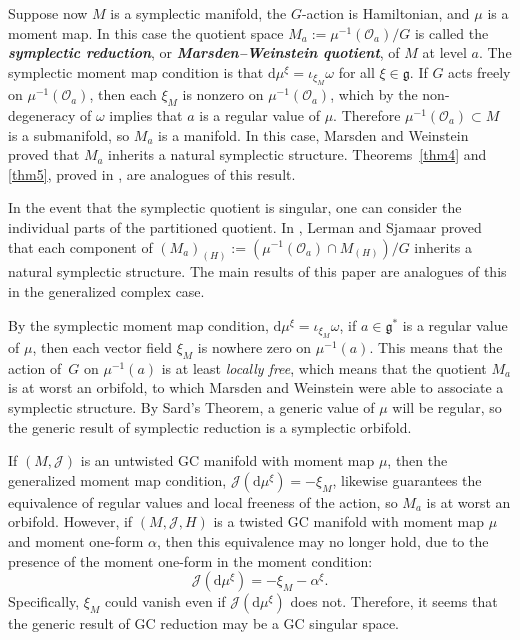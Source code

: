 \documentclass[pdftex]{sigma}
\numberwithin{equation}{section}
\newcommand{\deff}[1]{\textbf{\emph{#1}}}
\begin{document}
Suppose now $M$ is a symplectic manifold, the $G$-action is Hamiltonian, and $\mu$ is a moment map.  In this case the quotient space $M_a := \mu^{-1}(\mathcal{O}_a) / G$ is called the \deff{symplectic reduction}, or \deff{Marsden--Weinstein quotient}, of $M$ at level $a$.
The symplectic moment map condition is that $\mathrm{d} \mu^{\xi} = \iota_{\xi_M} \omega$ for all $\xi \in \mathfrak{g}$.  If $G$ acts freely on $\mu^{-1}(\mathcal{O}_a)$, then each $\xi_M$ is nonzero on $\mu^{-1}(\mathcal{O}_a)$, which by the non-degeneracy of $\omega$ implies that $a$ is a regular value of $\mu$.  Therefore $\mu^{-1}(\mathcal{O}_a) \subset M$ is a submanifold, so $M_a$ is a manifold.  In this case, Marsden and Weinstein proved that $M_a$ inherits a natural symplectic structure.  Theorems~\ref{thm4} and \ref{thm5}, proved in \cite{lintolman}, are analogues of this result.

In the event that the symplectic quotient is singular, one can consider the individual parts of the partitioned quotient.
In \cite{stratified}, Lerman and Sjamaar proved that each component of $\left( M_{a} \right)_{(H)} := \left( \mu^{-1}(\mathcal{O}_a) \cap M_{(H)} \right) / G$ inherits a natural symplectic structure.
The main results of this paper are analogues of this in the generalized complex case.


\begin{Remark} \label{rem3}
By the symplectic moment map condition, $\mathrm{d} \mu^{\xi} = \iota_{\xi_M} \omega$, if $a \in \mathfrak{g}^*$ is a regular value of $\mu$, then each vector f\/ield $\xi_M$ is nowhere zero on $\mu^{-1}(a)$.  This means that the action of~$G$ on $\mu^{-1}(a)$ is at least \emph{locally free}, which means that the quotient $M_a$ is at worst an orbifold, to which Marsden and Weinstein were able to associate a symplectic structure.  By Sard's Theorem, a generic value of $\mu$ will be regular, so the generic result of symplectic reduction is a symplectic orbifold.

If $(M,\mathcal{J})$ is an untwisted GC manifold with moment map $\mu$, then the generalized moment map condition, $\mathcal{J}(\mathrm{d} \mu^{\xi}) = -\xi_M$, likewise guarantees the equivalence of regular values and local freeness of the action, so $M_a$ is at worst an orbifold.  However, if $(M,\mathcal{J},H)$ is a twisted GC manifold with moment map $\mu$ and moment one-form $\alpha$, then this equivalence may no longer hold, due to the presence of the moment one-form in the moment condition:
\[
  \mathcal{J}(\mathrm{d} \mu^{\xi}) = -\xi_M - \alpha^{\xi}.
\]
Specif\/ically, $\xi_M$ could vanish even if $\mathcal{J}(\mathrm{d} \mu^{\xi})$ does not.  Therefore, it seems that the generic result of GC reduction may be a GC singular space.
\end{Remark}
\end{document}
